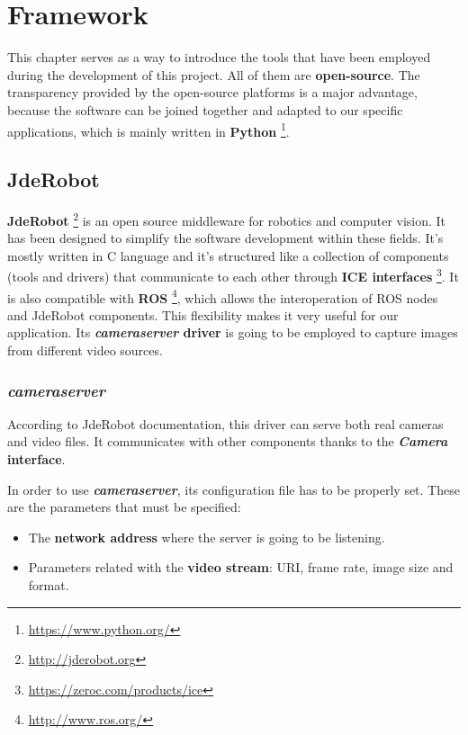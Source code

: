 \chapter{Framework}\label{ch:framework}
This chapter serves as a way to introduce the tools that have been employed during the development of this project. All of them are \textbf{open-source}. The transparency provided by the open-source platforms is a major advantage, because the software can be joined together and adapted to our specific applications, which is mainly written in \textbf{Python} \footnote{\url{https://www.python.org/}}.

\section{JdeRobot}\label{sec:jderobot}
\textbf{JdeRobot} \footnote{\url{http://jderobot.org}} is an open source middleware for robotics and computer vision. It has been designed to simplify the software development within these fields. It's mostly written in C\nolinebreak[4]\hspace{-.05em}\raisebox{.4ex}{\tiny\bf ++} language and it's structured like a collection of components (tools and drivers) that communicate to each other through \textbf{ICE interfaces} \footnote{\url{https://zeroc.com/products/ice}}. It is also compatible with \textbf{ROS} \footnote{\url{http://www.ros.org/}}, which allows the interoperation of ROS nodes and JdeRobot components. This flexibility makes it very useful for our application.
Its \textbf{\textit{cameraserver} driver} is going to be employed to capture images from different video sources.

\subsection{\textit{cameraserver}}\label{subsec:cameraserver}
According to JdeRobot documentation, this driver can serve both real cameras and video files. It communicates with other components thanks to the \textbf{\textit{Camera} interface}.

In order to use \textbf{\textit{cameraserver}}, its configuration file has to be properly set. These are the parameters that must be specified:
\begin{itemize}
    \item The \textbf{network address} where the server is going to be listening.
    
    \item Parameters related with the \textbf{video stream}: URI, frame rate, image size and format.
\end{itemize}

